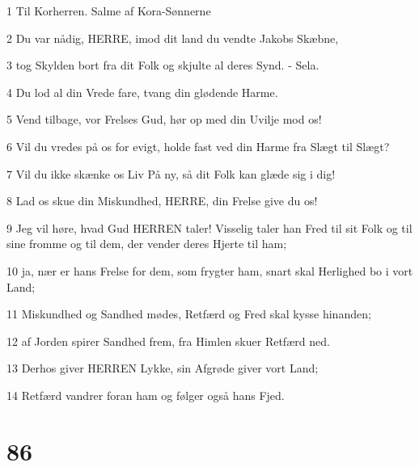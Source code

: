 \par 1 Til Korherren. Salme af Kora-Sønnerne
\par 2 Du var nådig, HERRE, imod dit land du vendte Jakobs Skæbne,
\par 3 tog Skylden bort fra dit Folk og skjulte al deres Synd. - Sela.
\par 4 Du lod al din Vrede fare, tvang din glødende Harme.
\par 5 Vend tilbage, vor Frelses Gud, hør op med din Uvilje mod os!
\par 6 Vil du vredes på os for evigt, holde fast ved din Harme fra Slægt til Slægt?
\par 7 Vil du ikke skænke os Liv På ny, så dit Folk kan glæde sig i dig!
\par 8 Lad os skue din Miskundhed, HERRE, din Frelse give du os!
\par 9 Jeg vil høre, hvad Gud HERREN taler! Visselig taler han Fred til sit Folk og til sine fromme og til dem, der vender deres Hjerte til ham;
\par 10 ja, nær er hans Frelse for dem, som frygter ham, snart skal Herlighed bo i vort Land;
\par 11 Miskundhed og Sandhed mødes, Retfærd og Fred skal kysse hinanden;
\par 12 af Jorden spirer Sandhed frem, fra Himlen skuer Retfærd ned.
\par 13 Derhos giver HERREN Lykke, sin Afgrøde giver vort Land;
\par 14 Retfærd vandrer foran ham og følger også hans Fjed.

\chapter{86}

